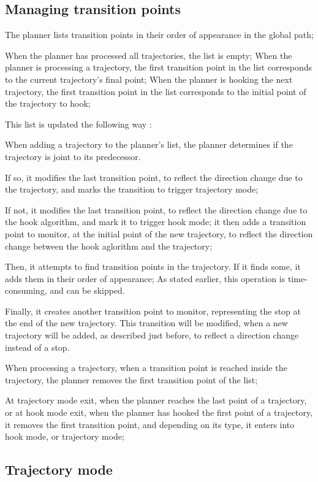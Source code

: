 \subsection{Managing transition points}

The planner lists transition points in their order of appearance in the global path;

When the planner has processed all trajectories, the list is empty;
When the planner is processing a trajectory, the first transition point in the list corresponds to the current
trajectory's final point;
When the planner is hooking the next trajectory, the first transition point in the list corresponds to the initial
point of the trajectory to hook;

This list is updated the following way :

When adding a trajectory to the planner's list, the planner determines if the trajectory is joint to its
predecessor.\newline

If so, it modifies the last transition point, to reflect the direction change due to the trajectory, and marks the
transition to trigger trajectory mode;\newline

If not, it modifies the last transition point, to reflect the direction change due to the hook algorithm, and mark it
to trigger hook mode;
it then adds a transition point to monitor, at the initial point of the new trajectory, to reflect the direction
change between the hook aglorithm and the trajectory;

Then, it attempts to find transition points in the trajectory.
If it finds some, it adds them in their order of appearance;
As stated earlier, this operation is time-consuming, and can be skipped.

Finally, it creates another transition point to monitor, representing the stop at the end of the new trajectory.
This transition will be modified, when a new trajectory will be added, as described just before, to reflect a direction
change instead of a stop.

When processing a trajectory, when a transition point is reached inside the trajectory, the planner removes the first
transition point of the list;

At trajectory mode exit, when the planner reaches the last point of a trajectory, or at hook mode exit, when the
planner has hooked the first point of a trajectory, it removes the first transition point, and depending on its type,
it enters into hook mode, or trajectory mode;


\subsection{Trajectory mode}

